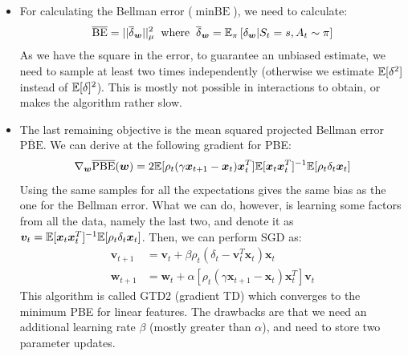 \begin{itemize}
	\item For calculating the Bellman error ($\min \text{BE}$), we need to calculate:
	$$\overline{\text{BE}}=||\overline{\delta}_{\bm{w}}||_{\mu}^2\hspace{2mm}\text{where}\hspace{2mm}\overline{\delta}_{\bm{w}}=\mathbb{E}_{\pi}\left[\delta_{\bm{w}}|S_t=s,A_t\sim\pi\right]$$
	As we have the square in the error, to guarantee an unbiased estimate, we need to sample at least two times independently (otherwise we estimate $\mathbb{E}[\delta^2]$ instead of $\mathbb{E}[\delta]^2$). This is mostly not possible in interactions to obtain, or makes the algorithm rather slow.
	
	\item The last remaining objective is the mean squared projected Bellman error $\overline{\text{PBE}}$. We can derive at the following gradient for PBE:
	$$\nabla_{\bm{w}} \overline{\text{PBE}}(\bm{w}) = 2\mathbb{E}[\rho_t (\gamma \bm{x}_{t+1}-\bm{x}_t)\bm{x}_t^T]\mathbb{E}[\bm{x}_t\bm{x}_t^T]^{-1}\mathbb{E}[\rho_t\delta_t\bm{x}_t]$$
	Using the same samples for all the expectations gives the same bias as the one for the Bellman error. What we can do, however, is learning some factors from all the data, namely the last two, and denote it as $\bm{v}_t=\mathbb{E}[\bm{x}_t\bm{x}_t^T]^{-1}\mathbb{E}[\rho_t\delta_t\bm{x}_t]$. Then, we can perform SGD as:
	\begin{equation*}
		\begin{split}
			\bm{v}_{t+1} & = \bm{v}_t + \beta \rho_t (\delta_t - \bm{v}_t^T \bm{x}_t)\bm{x}_t\\
			\bm{w}_{t+1} & = \bm{w}_t + \alpha \left[\rho_t (\gamma \bm{x}_{t+1}-\bm{x}_t)\bm{x}_t^T\right]\bm{v}_t
		\end{split}
	\end{equation*}
	This algorithm is called GTD2 (gradient TD) which converges to the minimum PBE for linear features. The drawbacks are that we need an additional learning rate $\beta$ (mostly greater than $\alpha$), and need to store two parameter updates.
	

\end{itemize}
